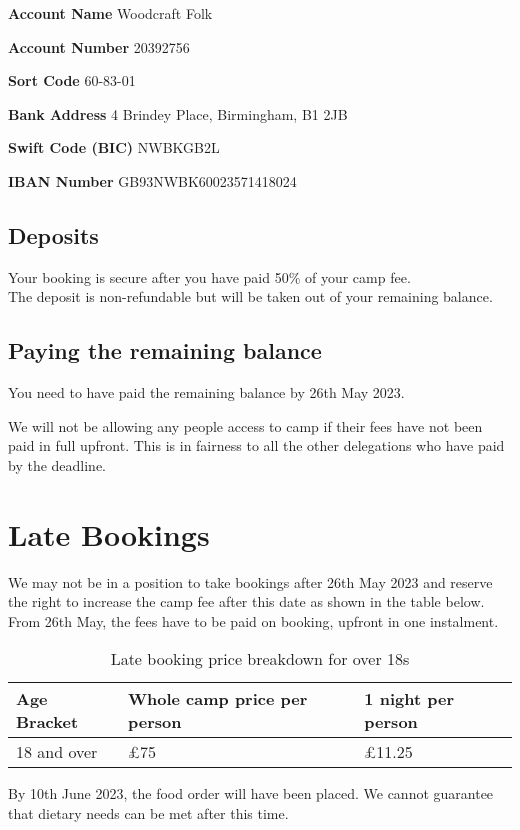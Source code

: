 \textbf{Account Name} Woodcraft Folk  

\textbf{Account Number} 20392756   

\textbf{Sort Code}  60-83-01  

\textbf{Bank Address} 4 Brindey Place, Birmingham, B1 2JB  

\textbf{Swift Code (BIC)} NWBKGB2L  

\textbf{IBAN Number} GB93NWBK60023571418024  

\subsection{Deposits}
Your booking is secure after you have paid 50\% of your camp fee.\\[1em]
The deposit is non-refundable but will be taken out of your remaining balance.


\subsection{Paying the remaining balance}
You need to have paid the remaining balance by 26th May 2023.

We will not be allowing any people access to camp if their fees have not been paid in full upfront. This is in fairness to all the other delegations who have paid by the deadline.

\section{Late Bookings}
We may not be in a position to take bookings after 26th May 2023 and reserve the right to increase the camp fee after this date as shown in the table below. From 26th May, the fees have to be paid on booking, upfront in one instalment.
\begin{table}[H]
    \centering   
    \begin{tabularx}{0.9\textwidth}{XXX}
        \textbf{Age Bracket} & \textbf{Whole camp price per person} & \textbf{1 night per person} \\
        \hline
        \hline
        18 and over & £75 & £11.25\\
        \hline
    \end{tabularx}
    \caption{Late booking price breakdown for over 18s}
\end{table}
By 10th June 2023, the food order will have been placed. We cannot guarantee that dietary needs can be met after this time. 

